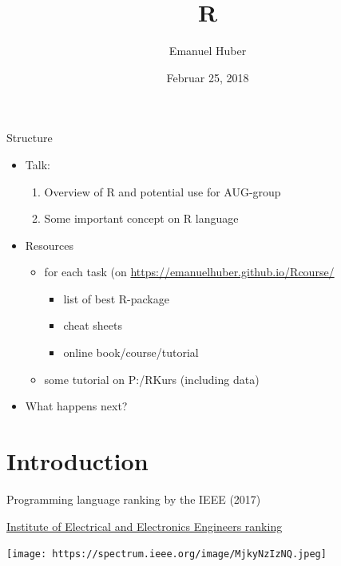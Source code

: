 \documentclass[9pt,ignorenonframetext,]{beamer}
\title{R}
\author{Emanuel Huber}
\date{Februar 25, 2018}
\providecommand{\tightlist}{%
  \setlength{\itemsep}{0pt}\setlength{\parskip}{0pt}}
\begin{document}
\frame{\titlepage}

\begin{frame}

\end{frame}

\begin{frame}{Structure}

\begin{itemize}
\tightlist
\item
  Talk:

  \begin{enumerate}
  \def\labelenumi{\arabic{enumi}.}
  \tightlist
  \item
    Overview of R and potential use for AUG-group
  \item
    Some important concept on R language
  \end{enumerate}
\item
  Resources

  \begin{itemize}
  \tightlist
  \item
    for each task (on \url{https://emanuelhuber.github.io/Rcourse/}

    \begin{itemize}
    \tightlist
    \item
      list of best R-package
    \item
      cheat sheets
    \item
      online book/course/tutorial
    \end{itemize}
  \item
    some tutorial on P:/RKurs (including data)
  \end{itemize}
\item
  What happens next?
\end{itemize}

\end{frame}

\section{Introduction}\label{introduction}

\begin{frame}{Programming language ranking by the IEEE (2017)}

\href{https://spectrum.ieee.org/computing/software/the-2017-top-programming-languages}{Institute
of Electrical and Electronics Engineers ranking}

\texttt{[image: https://spectrum.ieee.org/image/MjkyNzIzNQ.jpeg]}

\end{frame}
\end{document}
